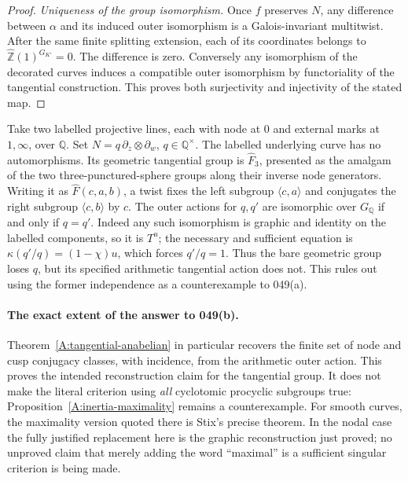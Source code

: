 \begin{proof}
\emph{Uniqueness of the group isomorphism.}
Once $f$ preserves $N$, any difference between $\alpha$ and its induced
outer isomorphism is a Galois-invariant multitwist. After the same
finite splitting extension, each of its coordinates belongs to
$\widehat{\mathbb Z}(1)^{G_{K'}}=0$. The difference is zero.
Conversely any isomorphism of the decorated curves induces a compatible
outer isomorphism by functoriality of the tangential construction.
This proves both surjectivity and injectivity of the stated map.
\end{proof}

\begin{example}
\label{A:nodal-q-test}
Take two labelled projective lines, each with node at $0$ and external
marks at $1,\infty$, over $\mathbb Q$. Set
$N=q\,\partial_z\otimes\partial_w$, $q\in\mathbb Q^\times$.
The labelled underlying curve has no automorphisms. Its geometric
tangential group is $\widehat F_3$, presented as the amalgam of the
two three-punctured-sphere groups along their inverse node generators.
Writing it as $\widehat F(c,a,b)$, a twist fixes the left subgroup
$\langle c,a\rangle$ and conjugates the right subgroup
$\langle c,b\rangle$ by $c$. The outer actions for $q,q'$ are
isomorphic over $G_{\mathbb Q}$ if and only if $q=q'$. Indeed any
such isomorphism is graphic and identity on the labelled components,
so it is $T^u$; the necessary and sufficient equation is
$\kappa(q'/q)=(1-\chi)u$, which forces $q'/q=1$.
Thus the bare geometric group loses $q$, but its specified arithmetic
tangential action does not. This rules out using the former
independence as a counterexample to 049(a).
\end{example}

\paragraph{The exact extent of the answer to 049(b).}
Theorem~\ref{A:tangential-anabelian} in particular recovers the finite
set of node and cusp conjugacy classes, with incidence, from the
arithmetic outer action. This proves the intended reconstruction
claim for the tangential group. It does not make the literal
criterion using \emph{all} cyclotomic procyclic subgroups true:
Proposition~\ref{A:inertia-maximality} remains a counterexample.
For smooth curves, the maximality version quoted there is Stix's
precise theorem. In the nodal case the fully justified replacement
here is the graphic reconstruction just proved; no unproved claim
that merely adding the word ``maximal'' is a sufficient singular
criterion is being made.

